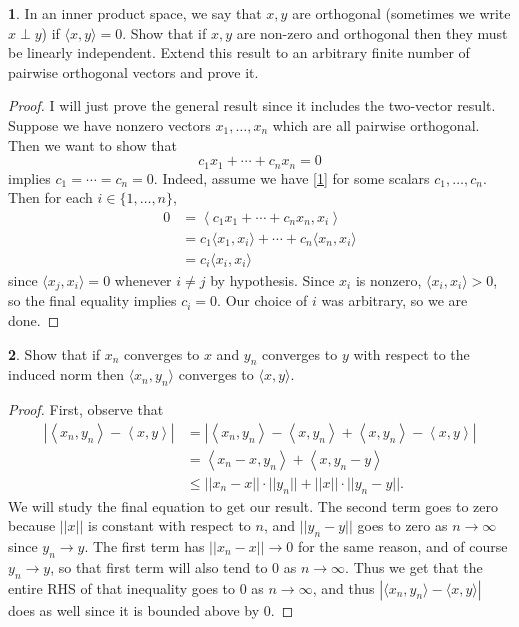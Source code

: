 \documentclass[12pt]{article}
\theoremstyle{definition}
\newtheorem{ex}{}
\begin{document}
\begin{ex}
	In an inner product space, we say that $x, y$ are orthogonal (sometimes we write $x \perp y$) if $\langle x, y \rangle = 0$.
	Show that if $x, y$ are non-zero and orthogonal then they must be linearly independent.
	Extend this result to an arbitrary finite number of pairwise orthogonal vectors and prove it.
\end{ex}
\begin{proof}
	I will just prove the general result since it includes the two-vector result.
	Suppose we have nonzero vectors $x_1, \dots, x_n$ which are all pairwise orthogonal.
	Then we want to show that \begin{equation}\label{1}
		c_1x_1 + \cdots + c_nx_n = 0
	\end{equation}
	implies $c_1 = \cdots = c_n = 0$.
	Indeed, assume we have \eqref{1} for some scalars $c_1, \dots, c_n$.
	Then for each $i \in \lbrace 1, \dots, n \rbrace$, \begin{align*}
		0 & = \left\langle c_1x_1 + \cdots + c_nx_n, x_i \right\rangle           \\
		  & = c_1\langle x_1, x_i \rangle + \cdots + c_n\langle x_n, x_i \rangle \\
		  & = c_i\langle x_i, x_i \rangle
	\end{align*}
	since $\langle x_j, x_i \rangle = 0$ whenever $i \neq j$ by hypothesis.
	Since $x_i$ is nonzero, $\langle x_i, x_i \rangle > 0$, so the final equality implies $c_i = 0$.
	Our choice of $i$ was arbitrary, so we are done.
\end{proof}

\begin{ex}
	Show that if $x_n$ converges to $x$ and $y_n$ converges to $y$ with respect to the induced norm then $\langle x_n, y_n \rangle$ converges to $\langle x, y \rangle$.
\end{ex}
\begin{proof}
	First, observe that \begin{align*}
		|\left\langle x_n, y_n \right\rangle - \left\langle x, y \right\rangle| & = |\left\langle x_n, y_n \right\rangle - \left\langle x, y_n \right\rangle + \left\langle x, y_n \right\rangle - \left\langle x, y \right\rangle| \\
		                                                                        & = \left\langle x_n - x, y_n \right\rangle + \left\langle x, y_n - y \right\rangle                                                                 \\
		                                                                        & \leq ||x_n-x||\cdot||y_n|| + ||x||\cdot||y_n-y||.
	\end{align*}
	We will study the final equation to get our result.
	The second term goes to zero because $||x||$ is constant with respect to $n$, and $||y_n - y||$ goes to zero as $n \to \infty$ since $y_n \to y$.
	The first term has $||x_n - x|| \to 0$ for the same reason, and of course $y_n \to y$, so that first term will also tend to 0 as $n \to \infty$.
	Thus we get that the entire RHS of that inequality goes to 0 as $n \to \infty$, and thus $|\langle x_n, y_n \rangle - \langle x, y \rangle|$ does as well since it is bounded above by 0.
\end{proof}
\end{document}
